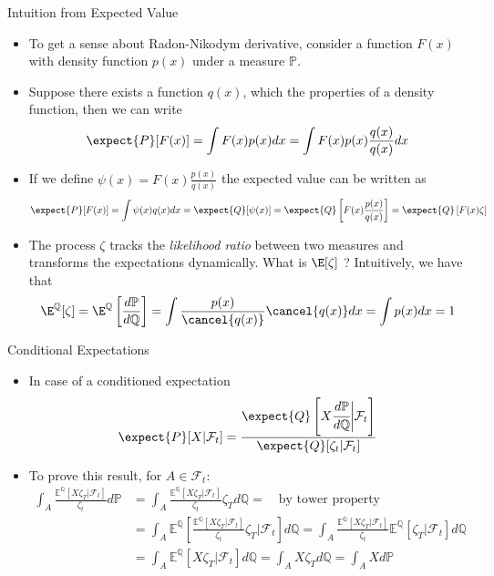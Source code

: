 \documentclass{beamer}
\begin{document}
\begin{frame}{Intuition from Expected Value}
	\begin{itemize}
		\item To get a sense about Radon-Nikodym derivative, consider a function $F(x)$ with density function $p(x)$ under a measure $\mathbb{P}$.
		\item Suppose there exists a function $q(x)$, which the properties of a density function, then we can write
		\begin{equation*}
			\expect{P}[F(x)]=\int F(x)p(x)dx = \int F(x)p(x)\frac{q(x)}{q(x)}dx
		\end{equation*}
		\item If we define $\psi(x)=F(x)\frac{p(x)}{q(x)}$ the expected value can be written as
		\begin{equation*}
			\expect{P}[F(x)] =\int\psi(x)q(x)dx=\expect{Q}[\psi(x)]=\expect{Q}\left[F(x)\frac{p(x)}{q(x)}\right]
			=\expect{Q}\left[F(x)\zeta\right]
		\end{equation*}
		\item The process $\zeta$ tracks the \emph{likelihood ratio} between two measures and transforms the expectations dynamically. What is $\E[\zeta]$ ? Intuitively, we have that
		\begin{equation*}
			\E^\mathbb{Q}[\zeta]=\E^\mathbb{Q}\left[\frac{d\mathbb{P}}{d\mathbb{Q}}\right]=\int \frac{p(x)}{\cancel{q(x)}} \cancel{q(x)} dx =\int p(x)dx = 1
		\end{equation*}
	\end{itemize}
	
\end{frame}

\begin{frame}{Conditional Expectations}
	\begin{itemize}
		\item In case of a conditioned expectation
		\begin{equation}
			\expect{P}[X|\mathcal{F}_t] = \frac{\expect{Q}\left[X\cfrac{d\mathbb{P}}{d\mathbb{Q}}\bigg|\mathcal{F}_t\right]}{\expect{Q}[\zeta_t|\mathcal{F}_t]}
			\label{eq:conditioned_expectation}
		\end{equation}
		\item To prove this result, for $A \in \mathcal{F}_t$:
		\begin{align*}
			\int_A \frac{\mathbb{E}^\mathbb{Q}[X\zeta_T|\mathcal{F}_t]}{\zeta_t} d\mathbb{P} &= \int_A \frac{\mathbb{E}^\mathbb{Q}[X\zeta_T|\mathcal{F}_t]}{\zeta_t} \zeta_T d\mathbb{Q} = \quad \text{by tower property}  \\
			&= \int_A \mathbb{E}^\mathbb{Q} \left[ \frac{\mathbb{E}^\mathbb{Q}[X\zeta_T|\mathcal{F}_t]}{\zeta_t} \zeta_T \bigg| \mathcal{F}_t \right] d\mathbb{Q} = \int_A \frac{\mathbb{E}^\mathbb{Q}[X\zeta_T|\mathcal{F}_t]}{\zeta_t} \mathbb{E}^\mathbb{Q}[\zeta_T|\mathcal{F}_t] d\mathbb{Q} \\
			&= \int_A \mathbb{E}^\mathbb{Q}[X\zeta_T|\mathcal{F}_t] d\mathbb{Q} = \int_A X\zeta_T d\mathbb{Q} = \int_A X d\mathbb{P}
		\end{align*}
	\end{itemize}
\end{frame}
\end{document}
